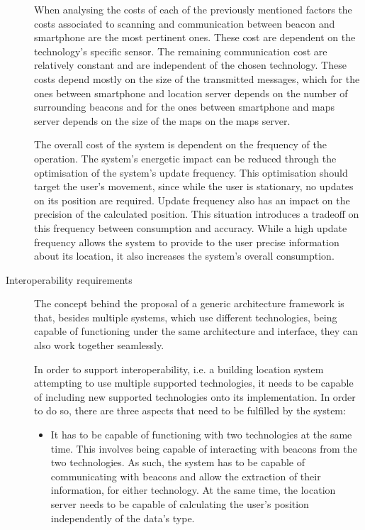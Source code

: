 \begin{description}
 
When analysing the costs of each of the previously mentioned factors the costs associated to scanning and communication between beacon and smartphone are the most pertinent ones. These cost are dependent on the technology's specific sensor. The remaining communication cost are relatively constant and are independent of the chosen technology. These costs depend mostly on the size of the transmitted messages, which for the ones between smartphone and location server depends on the number of surrounding beacons and for the ones between smartphone and maps server depends on the size of the maps on the maps server.   
 
 
The overall cost of the system is dependent on the frequency of the operation. The system's energetic impact can be reduced through the optimisation of the system's update frequency. This optimisation should target the user's movement, since while the user is stationary, no updates on its position are required. 
Update frequency also has an impact on the precision of the calculated position. This situation introduces a tradeoff on this frequency between consumption and accuracy. While a high update frequency allows the system to provide to the user precise information about its location, it also increases the system's overall consumption. 
 
 
\item [Interoperability requirements] The concept behind the proposal of a generic architecture framework is that, besides multiple systems, which use different technologies, being capable of functioning under the same architecture and interface, they can also work together seamlessly.  
 
 
In order to support interoperability, i.e. a building location system attempting to use multiple supported technologies, it needs to be capable of including new supported technologies onto its implementation. In order to do so, there are three aspects that need to be fulfilled by the system: 
 
 
\begin{itemize} 
\item It has to be capable of functioning with two technologies at the same time. This involves being capable of interacting with beacons from the two technologies. As such, the system has to be capable of communicating with beacons and allow the extraction of their information, for either technology. At the same time, the location server needs to be capable of calculating the user's position independently of the data's type. 
 

\end{itemize}
\end{description}
